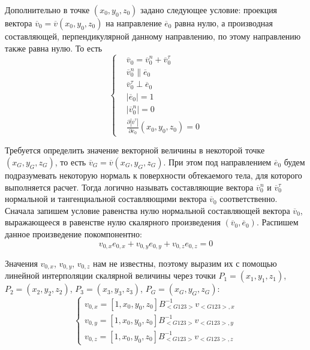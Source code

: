 Дополнительно в точке $(x_0, y_0, z_0)$ задано следующее условие: проекция вектора $\overline{v}_0 = \overline{v}(x_0, y_0, z_0)$ на направление $\overline{e}_0$ равна нулю, а производная составляющей, перпендикулярной данному направлению, по этому направлению также равна нулю.
То есть
\begin{equation}
	\left\{
		\begin{aligned}
			& \overline{v}_0 = \overline{v}_0^n + \overline{v}_0^{\tau} \\
			& \overline{v}_0^n \parallel \overline{e}_0 \\
			& \overline{v}_0^{\tau} \perp \overline{e}_0 \\
			& |\overline{e}_0| = 1 \\
			& |\overline{v}_0^n| = 0 \\
			& \frac{\partial{|\overline{v}^{\tau}|}}{\partial{\overline{e}_0}}(x_0, y_0, z_0) = 0 
		\end{aligned}
	\right.
\end{equation}

Требуется определить значение векторной величины в некоторой точке $(x_G, y_G, z_G)$, то есть $\overline{v}_G = \overline{v}(x_G, y_G, z_G)$.
При этом под направлением $\overline{e}_0$ будем подразумевать некоторую нормаль к поверхности обтекаемого тела, для которого выполняется расчет.
Тогда логично называть составляющие вектора $\overline{v}_0^n$ и $\overline{v}_0^{\tau}$ нормальной и тангенциальной составляющими вектора $\overline{v}_0$ соответственно.
Сначала запишем условие равенства нулю нормальной составляющей вектора $\overline{v}_0$, выражающееся в равенстве нулю скалярного произведения $(\overline{v}_0, \overline{e}_0)$. 
Распишем данное произведение покомпонентно:
\begin{equation}
	v_{0,x}e_{0,x} + v_{0,y}e_{0,y} + v_{0,z}e_{0,z} = 0
\end{equation}

Значения $v_{0,x}$, $v_{0,y}$, $v_{0,z}$ нам не известны, поэтому выразим их с помощью линейной интерполяции скалярной величины через точки $P_1 = (x_1, y_1, z_1)$, $P_2 = (x_2, y_2, z_2)$, $P_3 = (x_3, y_3, z_3)$, $P_G = (x_G, y_G, z_G)$:
\begin{equation}
	\left\{
		\begin{aligned}
			v_{0,x} = [1, x_0, y_0, z_0] B_{<G123>}^{-1} v_{<G123>,x} \\
			v_{0,y} = [1, x_0, y_0, z_0] B_{<G123>}^{-1} v_{<G123>,y} \\
			v_{0,z} = [1, x_0, y_0, z_0] B_{<G123>}^{-1} v_{<G123>,z}
		\end{aligned}
	\right.
\end{equation}

